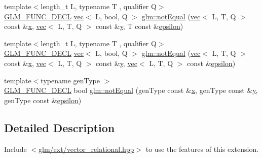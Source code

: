 \begin{DoxyCompactItemize}
\item 
{\footnotesize template$<$length\+\_\+t L, typename T , qualifier Q$>$ }\\\mbox{\hyperlink{setup_8hpp_ab2d052de21a70539923e9bcbf6e83a51}{G\+L\+M\+\_\+\+F\+U\+N\+C\+\_\+\+D\+E\+CL}} \mbox{\hyperlink{structglm_1_1vec}{vec}}$<$ L, bool, Q $>$ \mbox{\hyperlink{group__ext__vector__relational_ga59a03a51402b6e1ce80f9a3b436f17bd}{glm\+::not\+Equal}} (\mbox{\hyperlink{structglm_1_1vec}{vec}}$<$ L, T, Q $>$ const \&\mbox{\hyperlink{_s_d_l__opengl_8h_ad0e63d0edcdbd3d79554076bf309fd47}{x}}, \mbox{\hyperlink{structglm_1_1vec}{vec}}$<$ L, T, Q $>$ const \&\mbox{\hyperlink{_s_d_l__opengl_8h_a1675d9d7bb68e1657ff028643b4037e3}{y}}, T const \&\mbox{\hyperlink{group__gtc__constants_ga2a1e57fc5592b69cfae84174cbfc9429}{epsilon}})
\item 
{\footnotesize template$<$length\+\_\+t L, typename T , qualifier Q$>$ }\\\mbox{\hyperlink{setup_8hpp_ab2d052de21a70539923e9bcbf6e83a51}{G\+L\+M\+\_\+\+F\+U\+N\+C\+\_\+\+D\+E\+CL}} \mbox{\hyperlink{structglm_1_1vec}{vec}}$<$ L, bool, Q $>$ \mbox{\hyperlink{group__ext__vector__relational_ga0497a636e5e8140bb7ebc021baf86637}{glm\+::not\+Equal}} (\mbox{\hyperlink{structglm_1_1vec}{vec}}$<$ L, T, Q $>$ const \&\mbox{\hyperlink{_s_d_l__opengl_8h_ad0e63d0edcdbd3d79554076bf309fd47}{x}}, \mbox{\hyperlink{structglm_1_1vec}{vec}}$<$ L, T, Q $>$ const \&\mbox{\hyperlink{_s_d_l__opengl_8h_a1675d9d7bb68e1657ff028643b4037e3}{y}}, \mbox{\hyperlink{structglm_1_1vec}{vec}}$<$ L, T, Q $>$ const \&\mbox{\hyperlink{group__gtc__constants_ga2a1e57fc5592b69cfae84174cbfc9429}{epsilon}})
\item 
{\footnotesize template$<$typename gen\+Type $>$ }\\\mbox{\hyperlink{setup_8hpp_ab2d052de21a70539923e9bcbf6e83a51}{G\+L\+M\+\_\+\+F\+U\+N\+C\+\_\+\+D\+E\+CL}} bool \mbox{\hyperlink{group__ext__vector__relational_ga27c5118811bcfed5504e50f22693373e}{glm\+::not\+Equal}} (gen\+Type const \&\mbox{\hyperlink{_s_d_l__opengl_8h_ad0e63d0edcdbd3d79554076bf309fd47}{x}}, gen\+Type const \&\mbox{\hyperlink{_s_d_l__opengl_8h_a1675d9d7bb68e1657ff028643b4037e3}{y}}, gen\+Type const \&\mbox{\hyperlink{group__gtc__constants_ga2a1e57fc5592b69cfae84174cbfc9429}{epsilon}})
\end{DoxyCompactItemize}


\subsection{Detailed Description}
Include $<$\mbox{\hyperlink{ext_2vector__relational_8hpp}{glm/ext/vector\+\_\+relational.\+hpp}}$>$ to use the features of this extension.

